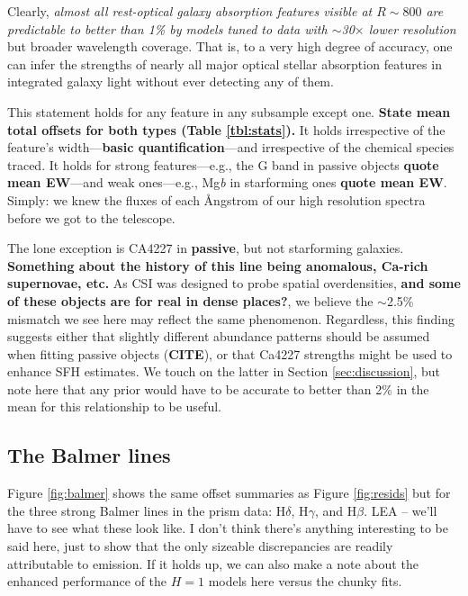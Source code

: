 \documentclass[a4paper,fleqn,usenatbib]{mnras}
\newcommand{\bfr}{\bf\color{red}}
\newcommand{\bfb}{\color{myblue}}
\newcommand{\CITE}{{\bfr CITE}}
\begin{document}
Clearly, {\it almost all rest-optical galaxy absorption features 
visible at $R\sim800$ are predictable to better than 1\% by models tuned to data with $\sim$30$\times$
lower resolution} but broader wavelength coverage. That is, to a very high degree of accuracy, one can 
infer the strengths of nearly all major optical stellar absorption features in integrated galaxy light 
without ever detecting any of them.

This statement holds for any feature in any subsample except one. 
{\bfr State mean total offsets for both types (Table \ref{tbl:stats}).} It holds irrespective of the feature's 
width---{\bfr basic quantification}---and irrespective of the chemical species traced. 
It holds for strong features---e.g., the G band in passive objects {\bfr quote mean
EW}---and weak ones---e.g., Mg{\it b} in starforming ones {\bfr quote mean EW}. Simply: we 
knew the fluxes of each \AA ngstrom of our high resolution spectra before we got to the
telescope.

The lone exception is CA4227 in {\bfr passive}, but not starforming galaxies. {\bfr Something 
about the history of this line being anomalous, Ca-rich supernovae, etc.} As CSI was designed 
to probe spatial overdensities, {\bfr
and some of these objects are for real in dense places?}, we believe the $\sim$2.5\%
mismatch we see here may reflect the same phenomenon. Regardless, this finding suggests either that
slightly different abundance patterns should be assumed when fitting passive objects (\CITE), 
or that Ca4227 strengths might be used to enhance SFH estimates. We touch on the latter in 
Section \ref{sec:discussion}, but note here that any prior would have to be accurate to better than 
2\% in the mean for this relationship to be useful.

\subsection{The Balmer lines}
\label{sec:balmer}

Figure \ref{fig:balmer} shows the same offset summaries as Figure \ref{fig:resids} but for the three
strong Balmer lines in the prism data: H$\delta$, H$\gamma$, and H$\beta$. {\bfb LEA -- we'll have 
to see what these look like. I don't think there's anything interesting to be said here, just to show that
the only sizeable discrepancies are readily attributable to emission. If it holds up, we can also make
a note about the enhanced performance of the $H=1$ models here versus the chunky fits.}
\end{document}

